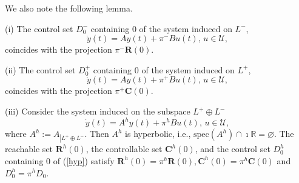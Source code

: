 \documentclass{siamltex}%
\begin{document}
We also note the following lemma.

\begin{lemma}
\label{Lemma_projection}(i) The control set $D_{0}^{-}$ containing $0$ of the
system induced on $L^{-}$,%
\begin{equation}
\dot{y}(t)=Ay(t)+\pi^{-}Bu(t),\,u\in\mathcal{U}, \label{P}%
\end{equation}
coincides with the projection $\pi^{-}\mathbf{R}(0)$.

(ii) The control set $D_{0}^{+}$ containing $0$ of the system induced on
$L^{+}$,%
\begin{equation}
\dot{y}(t)=Ay(t)+\pi^{+}Bu(t),\,u\in\mathcal{U}, \label{P+}%
\end{equation}
coincides with the projection $\pi^{+}\mathbf{C}(0)$.

(iii) Consider the system induced on the subspace $L^{+}\oplus L^{-}$%
\begin{equation}
\dot{y}(t)=A^{h}y(t)+\pi^{h}Bu(t),\,u\in\mathcal{U}, \label{hyp}%
\end{equation}
where $A^{h}:=A_{\left\vert L^{+}\oplus L^{-}\right.  }$. Then $A^{h}$ is
hyperbolic, i.e., $\mathrm{spec}(A^{h})\cap\imath\mathbb{R}=\varnothing$. The
reachable set $\mathbf{R}^{h}(0)$, the controllable set $\mathbf{C}^{h}(0)$,
and the control set $D_{0}^{h}$ containing $0$ of (\ref{hyp}) satisfy
$\mathbf{R}^{h}(0)=\pi^{h}\mathbf{R}(0),\mathbf{C}^{h}(0)=\pi^{h}%
\mathbf{C}(0)$ and $D_{0}^{h}=\pi^{h}D_{0}$.
\end{lemma}
\end{document}
